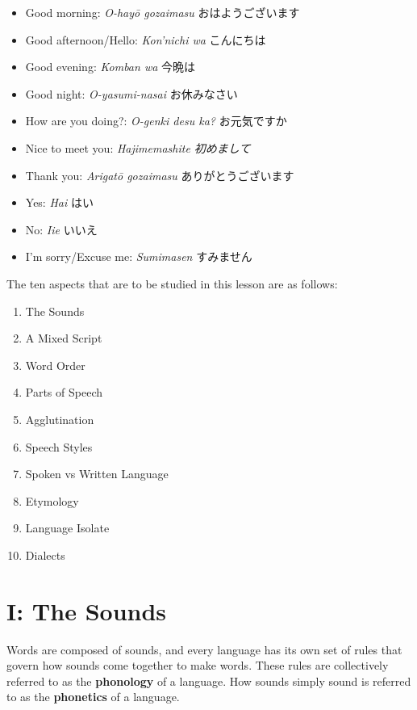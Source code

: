 \begin{itemize}

\item Good morning: \emph{O-hayō gozaimasu }おはようございます \hfill\break

\item Good afternoon\slash Hello: \emph{Kon'nichi wa }こんにちは \hfill\break

\item Good evening: \emph{Komban wa }今晩は 
\item Good night: \emph{O-yasumi-nasai }お休みなさい 
\item How are you doing?: \emph{O-genki desu ka? }お元気ですか 
\item Nice to meet you: \emph{Hajimemashite 初めまして }
\item Thank you: \emph{Arigatō gozaimasu }ありがとうございます 
\item Yes: \emph{Hai }はい 
\item No: \emph{Iie }いいえ 
\item I'm sorry\slash Excuse me: \emph{Sumimasen }すみません 
\end{itemize}
 The ten aspects that are to be studied in this lesson are as follows: 
\begin{enumerate}

\item The Sounds 
\item A Mixed Script 
\item Word Order \hfill\break

\item Parts of Speech 
\item Agglutination 
\item Speech Styles 
\item Spoken vs Written Language 
\item Etymology 
\item Language Isolate 
\item Dialects 
\end{enumerate}
      
\section{I: The Sounds}
 
\par{ Words are composed of sounds, and every language has its own set of rules that govern how sounds come together to make words. These rules are collectively referred to as the \textbf{phonology }of a language. How sounds simply sound is referred to as the \textbf{phonetics }of a language. }

